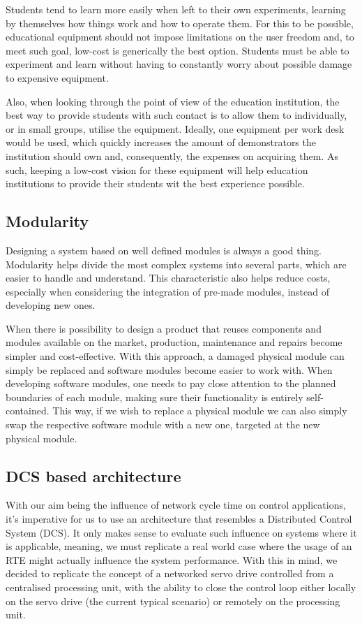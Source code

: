 Students tend to learn more easily when left to their own experiments, learning by themselves how things work and how to operate them. %
For this to be possible, educational equipment should not impose limitations on the user freedom and, to meet such goal, low-cost is generically the best option.
Students must be able to experiment and learn without having to constantly worry about possible damage to expensive equipment.

Also, when looking through the point of view of the education institution, the best way to provide students with such contact is to allow them to individually, or in small groups, utilise the equipment.
Ideally, one equipment per work desk would be used, which quickly increases the amount of demonstrators the institution should own and, consequently, the expenses on acquiring them.
As such, keeping a low-cost vision for these equipment will help education institutions to provide their students wit the best experience possible.

\subsection{Modularity}

Designing a system based on well defined modules is always a good thing.
Modularity helps divide the most complex systems into several parts, which are easier to handle and understand.
This characteristic also helps reduce costs, especially when considering the integration of pre-made modules, instead of developing new ones.

When there is possibility to design a product that reuses components and modules available on the market, production, maintenance and repairs become simpler and cost-effective.
With this approach, a damaged physical module can simply be replaced and software modules become easier to work with.
When developing software modules, one needs to pay close attention to the planned boundaries of each module, making sure their functionality is entirely self-contained.
This way, if we wish to replace a physical module we can also simply swap the respective software module with a new one, targeted at the new physical module.

\subsection{DCS based architecture}

With our aim being the influence of network cycle time on control applications, it's imperative for us to use an architecture that resembles a Distributed Control System (DCS).
It only makes sense to evaluate such influence on systems where it is applicable, meaning, we must replicate a real world case where the usage of an RTE might actually influence the system performance.
With this in mind, we decided to replicate the concept of a networked servo drive controlled from a centralised processing unit, with the ability to close the control loop either locally on the servo drive (the current typical scenario) or remotely on the processing unit.

